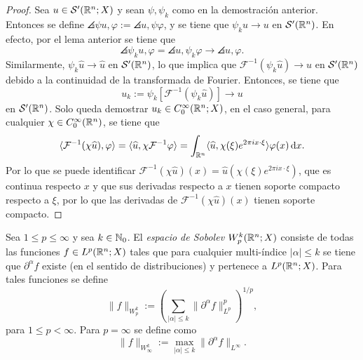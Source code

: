 \begin{proof}
	Sea $u\in\mathcal{S}'(\mathbb{R}^n;X)$ y sean $\psi,\psi_k$ como en la demostración anterior. Entonces se define $\angles{\psi u, \varphi} := \angles{u, \psi\varphi}$, y se tiene que $\psi_ku\rightarrow u$ en $\mathcal{S}'(\mathbb{R}^n)$. En efecto, por el lema anterior se tiene que
	\begin{equation*}
		\angles{\psi_k u, \varphi} = \angles{u, \psi_k\varphi} \rightarrow \angles{u, \varphi}.
	\end{equation*}
	Similarmente, $\psi_k\widehat{u}\rightarrow\widehat{u}$ en $\mathcal{S}'(\mathbb{R}^n)$, lo que implica que $\mathcal{F}^{-1}(\psi_k\widehat{u})\rightarrow u$ en $\mathcal{S}'(\mathbb{R}^n)$ debido a la continuidad de la transformada de Fourier. Entonces, se tiene que 
	\begin{equation*}
		u_k := \psi_k [\mathcal{F}^{-1}(\psi_k\widehat{u}) ]\rightarrow u
	\end{equation*}
	en $\mathcal{S}'(\mathbb{R}^n)$. Solo queda demostrar $u_k\in C^\infty_0(\mathbb{R}^n;X)$, en el caso general, para cualquier $\chi\in C^\infty_0(\mathbb{R}^n)$, se tiene que 
	\begin{equation*}
		\langle\mathcal{F}^{-1}(\chi \widehat{u}), \varphi\rangle  = 
		\langle\widehat{u}, \chi\mathcal{F}^{-1}\varphi\rangle 
		 = \int_{\mathbb{R}^n} \langle\widehat{u},\chi(\xi) e^{2\pi i x\cdot\xi}\rangle\varphi(x) \mathop{}\!\mathrm{d} x.
	\end{equation*}
	Por lo que se puede identificar $\mathcal{F}^{-1}(\chi \widehat{u})(x) = \widehat{u}(\chi(\xi)e^{2\pi ix\cdot\xi})$, que es continua respecto $x$ y que sus derivadas respecto a $x$ tienen soporte compacto respecto a $\xi$, por lo que las derivadas de $\mathcal{F}^{-1}(\chi \widehat{u})(x)$ tienen soporte compacto.
\end{proof}
\begin{definition}
	Sea $1\leq p \leq\infty$ y sea $k\in\mathbb{N}_0$. El \textit{espacio de Sobolev} $W^k_p(\mathbb{R}^n;X)$ consiste de todas las funciones $f\in L^p(\mathbb{R}^n;X)$ tales que para cualquier multi-índice $|\alpha|\leq k$ se tiene que $\partial^\alpha f$ existe (en el sentido de distribuciones) y pertenece a $L^p(\mathbb{R}^n;X)$. Para tales funciones se define 
	\begin{equation*}
		\|f\|_{W^k_p} := \left( \sum_{|\alpha|\leq k} \|\partial^\alpha f\|_{L^p}^p
		\right)^{1/p},
	\end{equation*}
	para $1\leq p <\infty$. Para $p=\infty$ se define como 
	\begin{equation*}
		\|f\|_{W^k_\infty} := \max_{|\alpha|\leq k} \|\partial^\alpha f\|_{L^\infty}.
	\end{equation*}
\end{definition}
